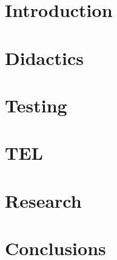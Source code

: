 \documentclass[a4paper,10pt,twoside]{report}
\begin{document}
\listoftables

\clearemptydoublepage



\chapter{Introduction}\label{chapter:introduction}
\setcounter{page}{0}


\clearemptydoublepage

% 

\clearemptydoublepage

\chapter{Didactics}\label{chapter:didactics}


\clearemptydoublepage

\chapter{Testing}\label{chapter:testing}


\clearemptydoublepage

\chapter{TEL}\label{chapter:tel}


\clearemptydoublepage

\chapter{Research}\label{chapter:research}


\clearemptydoublepage

\chapter{Conclusions}\label{chapter:conclusions}


\clearemptydoublepage

%
%



\clearemptydoublepage

\appendix
{}

\end{document}
